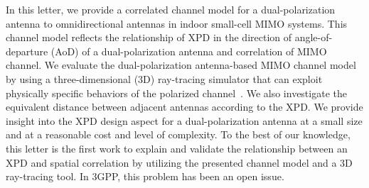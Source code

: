 \documentclass[journal]{IEEEtran}
\begin{document}
In this letter, we provide a correlated channel model for a dual-polarization antenna to omnidirectional antennas in indoor small-cell MIMO systems. This channel model reflects the relationship of XPD in the direction of angle-of-departure (AoD) of a dual-polarization antenna and correlation of MIMO channel. We evaluate the dual-polarization antenna-based MIMO channel model by using a three-dimensional (3D) ray-tracing simulator that can exploit physically specific behaviors of the polarized channel~\cite{ComMag_METIS,Lim_Mapbased}. We also investigate the equivalent distance between adjacent antennas according to the XPD. We provide insight into the XPD design aspect for a dual-polarization antenna at a small size and at a reasonable cost and level of complexity. To the best of our knowledge, this letter is the first work to explain and validate the relationship between an XPD and spatial correlation by utilizing the presented channel model and a 3D ray-tracing tool. In 3GPP, this problem has been an open issue.



\end{document}
